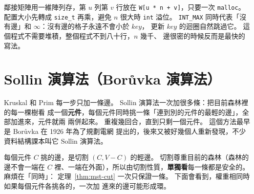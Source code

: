 
鄰接矩陣用一維陣列存，第 $u$ 列第 $v$ 行放在 \texttt{W[u * n + v]}，只要一次
\texttt{malloc}。 配置大小先轉成 \texttt{size\_t} 再乘，避免 $n$ 很大時 \texttt{int} 溢位。
\texttt{INT\_MAX} 同時代表「沒有邊」和 $\infty$：沒有邊的格子永遠不會小於 $\mathit{key}$，
更新 $\mathit{key}$ 的迴圈自然跳過它。 這個程式不需要堆積，整個程式不到八十行，$n$ 幾千、
邊很密的時候反而是最快的寫法。

\section{Sollin 演算法（Borůvka 演算法）}
\label{sec:mst-sollin}

Kruskal 和 Prim 每一步只加一條邊。 Sollin 演算法一次加很多條：把目前森林裡的每一棵樹看
成一個\textbf{元件}，每個元件同時挑一條「連到別的元件的最輕的邊」，全部加進來，元件就兩
兩併起來。 重複幾回合，直到只剩一個元件。 這個方法最早是 Borůvka 在 1926 年為了規劃電網
提出的，後來又被好幾個人重新發現，不少資料結構課本叫它 Sollin 演算法。

每個元件 $C$ 挑的邊，是切割 $(C, V - C)$ 的輕邊。 切割尊重目前的森林（森林的邊不會一端在
$C$ 裡、一端在外面），所以由切割性質，\textbf{單獨看}每一條都是安全的。 麻煩在「同時」：
定理~\ref{thm:mst-cut} 一次只保證一條。 下面會看到，權重相同時如果每個元件各挑各的，一次加
進來的邊可能形成環。

